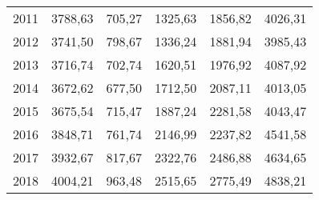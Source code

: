 \begin{center}
\begin{longtable}{|r|c|c|c|c|l|}
	2011 & 3788,63   & 705,27  & 1325,63  & 1856,82  & 4026,31 \\
	2012 & 3741,50   & 798,67  & 1336,24  & 1881,94  & 3985,43 \\
	2013 & 3716,74   & 702,74  & 1620,51  & 1976,92  & 4087,92 \\
	2014 & 3672,62   & 677,50  & 1712,50  & 2087,11  & 4013,05 \\
	2015 & 3675,54   & 715,47  & 1887,24  & 2281,58  & 4043,47 \\
	2016 & 3848,71   & 761,74  & 2146,99  & 2237,82  & 4541,58 \\
	2017 & 3932,67   & 817,67  & 2322,76  & 2486,88  & 4634,65 \\
	2018 & 4004,21   & 963,48  & 2515,65  & 2775,49  & 4838,21 \\ \hline
\end{longtable}
\end{center}
